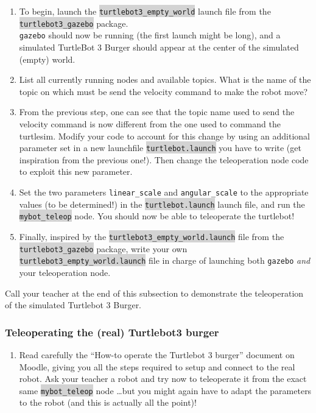 \documentclass[10pt,a4paper,printanswers]{upmc}
\newcounter{mainmemorder}
\newcommand{\save}{\setcounter{mainmemorder}{\value{enumi}}}
\newcommand{\load}{\setcounter{enumi}{\value{mainmemorder}}}
\newcommand{\mytext}[1]{\colorbox{lightgray}{\texttt{#1}}}
\begin{document}
\begin{enumerate}
  \load
  \item To begin, launch the \mytext{turtlebot3\_empty\_world} launch file from the
        \mytext{turtlebot3\_gazebo} package. \\\texttt{gazebo} should now be running (the first
        launch might be long), and a simulated TurtleBot 3 Burger should appear at the center of the
        simulated (empty) world.
  \item List all currently running nodes and available topics. What is the name of the topic on
        which must be send the velocity command to make the robot move?
  \item From the previous step, one can see that the topic name used to send the velocity command is
        now different from the one used to command the turtlesim. Modify your code to account for this
        change by using an additional parameter set in a new launchfile \mytext{turtlebot.launch} you have
        to write (get inspiration from the previous one!). Then change the teleoperation node code to
        exploit this new parameter.
  \item Set the two parameters \texttt{linear\_scale} and \texttt{angular\_scale} to the appropriate
        values (to be determined!) in the \mytext{turtlebot.launch} launch file, and run the
        \mytext{mybot\_teleop} node. You should now be able to teleoperate the turtlebot!
  \item Finally, inspired by the \mytext{turtlebot3\_empty\_world.launch} file from the
        \mytext{turtlebot3\_gazebo} package, write your own \mytext{turtlebot3\_empty\_world.launch} file
        in charge of launching both \texttt{gazebo} \textit{and} your teleoperation node.
        \save
\end{enumerate}

\begin{mdframed}[style=evaluation]
  Call your teacher at the end of this subsection to demonstrate the teleoperation of the simulated
  Turtlebot 3 Burger.
\end{mdframed}

\subsubsection{Teleoperating the (real) Turtlebot3 burger}

\begin{enumerate}
  \load
  \item Read carefully the ``How-to operate the Turtlebot 3 burger'' document on Moodle, giving you
        all the steps required to setup and connect to the real robot. Ask your teacher a robot and
        try now to teleoperate it from the exact same \mytext{mybot\_teleop} node \ldots but you
        might again have to adapt the parameters to the robot (and this is actually all the point)!
\end{enumerate}
\end{document}
